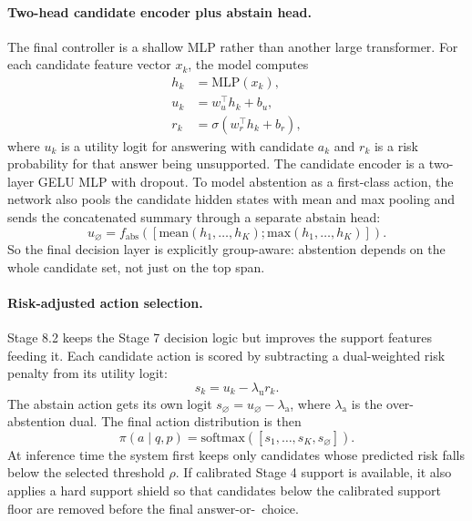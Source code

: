 \paragraph{Two-head candidate encoder plus abstain head.}
The final controller is a shallow MLP rather than another large transformer.
For each candidate feature vector \(x_k\), the model computes
\begin{align}
  h_k &= \mathrm{MLP}(x_k), \\
  u_k &= w_u^\top h_k + b_u, \\
  r_k &= \sigma(w_r^\top h_k + b_r),
\end{align}
where \(u_k\) is a utility logit for answering with candidate \(a_k\) and
\(r_k\) is a risk probability for that answer being unsupported.
The candidate encoder is a two-layer GELU MLP with dropout.
To model abstention as a first-class action, the network also pools the
candidate hidden states with mean and max pooling and sends the concatenated
summary through a separate abstain head:
\begin{equation}
  u_{\varnothing}
  =
  f_{\mathrm{abs}}\!\left(
    \left[
      \mathrm{mean}(h_1,\dots,h_K);
      \mathrm{max}(h_1,\dots,h_K)
    \right]
  \right).
\end{equation}
So the final decision layer is explicitly group-aware:
abstention depends on the whole candidate set, not just on the top span.

\paragraph{Risk-adjusted action selection.}
Stage 8.2 keeps the Stage 7 decision logic but improves the support features
feeding it.
Each candidate action is scored by subtracting a dual-weighted risk penalty
from its utility logit:
\begin{equation}
  s_k = u_k - \lambda_{\mathrm{u}} r_k.
\end{equation}
The abstain action gets its own logit
\(s_{\varnothing} = u_{\varnothing} - \lambda_{\mathrm{a}}\),
where \(\lambda_{\mathrm{a}}\) is the over-abstention dual.
The final action distribution is then
\begin{equation}
  \pi(a \mid q,p)
  =
  \mathrm{softmax}([s_1,\dots,s_K,s_{\varnothing}]).
\end{equation}
At inference time the system first keeps only candidates whose predicted risk
falls below the selected threshold \(\rho\).
If calibrated Stage 4 support is available, it also applies a hard support
shield so that candidates below the calibrated support floor are removed before
the final answer-or-\abstain\ choice.

